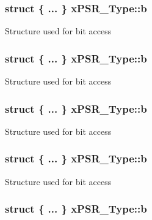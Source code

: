 \hypertarget{unionx_p_s_r___type_a42867881c11d9d77ff171fff21744af7}{
\subsubsection[{b}]{\setlength{\rightskip}{0pt plus 5cm}struct \{ ... \}   x\-P\-S\-R\-\_\-\-Type\-::b}}\label{unionx_p_s_r___type_a42867881c11d9d77ff171fff21744af7}
Structure used for bit access \hypertarget{unionx_p_s_r___type_aa7f9748b4102e18a6409ab6037b1c087}{
\subsubsection[{b}]{\setlength{\rightskip}{0pt plus 5cm}struct \{ ... \}   x\-P\-S\-R\-\_\-\-Type\-::b}}\label{unionx_p_s_r___type_aa7f9748b4102e18a6409ab6037b1c087}
Structure used for bit access \hypertarget{unionx_p_s_r___type_a977d6698be0d727360ed8f94bfadf2dc}{
\subsubsection[{b}]{\setlength{\rightskip}{0pt plus 5cm}struct \{ ... \}   x\-P\-S\-R\-\_\-\-Type\-::b}}\label{unionx_p_s_r___type_a977d6698be0d727360ed8f94bfadf2dc}
Structure used for bit access \hypertarget{unionx_p_s_r___type_af000254af08f5ff97dea9d3dcae85e3d}{
\subsubsection[{b}]{\setlength{\rightskip}{0pt plus 5cm}struct \{ ... \}   x\-P\-S\-R\-\_\-\-Type\-::b}}\label{unionx_p_s_r___type_af000254af08f5ff97dea9d3dcae85e3d}
Structure used for bit access \hypertarget{unionx_p_s_r___type_a37909be48c1aeb4c53382e98e4a3fe4b}{
\subsubsection[{b}]{\setlength{\rightskip}{0pt plus 5cm}struct \{ ... \}   x\-P\-S\-R\-\_\-\-Type\-::b}}\label{unionx_p_s_r___type_a37909be48c1aeb4c53382e98e4a3fe4b}
